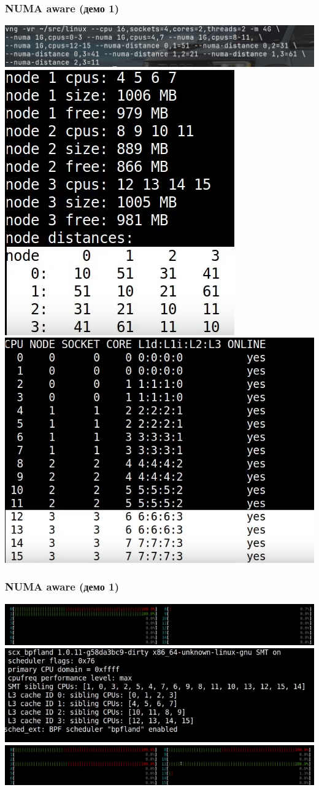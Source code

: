 \documentclass[aspectratio=169]{beamer}
\begin{document}
\begin{frame}
  \frametitle{NUMA aware (демо 1)}
  \includegraphics[width=\linewidth]{res/D0_2.png}
  \includegraphics[width=0.3\linewidth]{res/D0_3.png}
  \includegraphics[width=0.47\linewidth]{res/D0_4.png}
\end{frame}

\begin{frame}
  \vspace*{0.2cm}
  \frametitle{NUMA aware (демо 1)}
  \includegraphics[width=\linewidth]{res/D0_5.png}
  \includegraphics[width=\linewidth]{res/D0_6.png}
  \includegraphics[width=\linewidth]{res/D0_7.png}
\end{frame}
\end{document}
